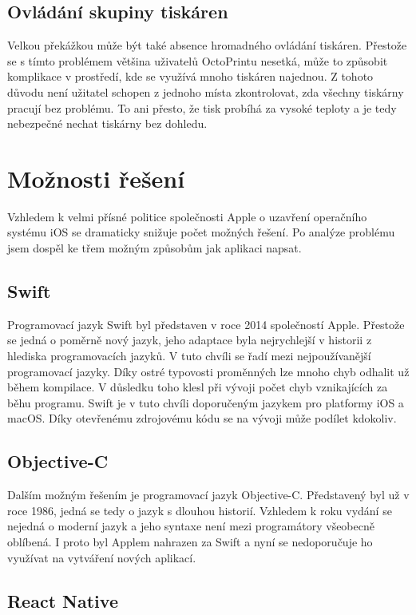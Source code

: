 \documentclass[czech]{article}
\begin{document}
\subsection{Ovládání skupiny tiskáren}

Velkou překážkou může být také absence hromadného ovládání tiskáren. Přestože se s tímto problémem většina uživatelů OctoPrintu nesetká, může to způsobit komplikace v prostředí, kde se využívá mnoho tiskáren najednou. Z tohoto důvodu není užitatel schopen z jednoho místa zkontrolovat, zda všechny tiskárny pracují bez problému. To ani přesto, že tisk probíhá za vysoké teploty a je tedy nebezpečné nechat tiskárny bez dohledu.

\section{Možnosti řešení}

Vzhledem k velmi přísné politice společnosti Apple o uzavření operačního systému iOS se dramaticky snižuje počet možných řešení. Po analýze problému jsem dospěl ke třem možným způsobům jak aplikaci napsat.

\subsection{Swift}

Programovací jazyk Swift byl představen v roce 2014 společností Apple. Přestože se jedná o poměrně nový jazyk, jeho adaptace byla nejrychlejší v historii z hlediska programovacích jazyků. V tuto chvíli se řadí mezi nejpoužívanější programovací jazyky. Díky ostré typovosti proměnných lze mnoho chyb odhalit už během kompilace. V důsledku toho klesl při vývoji počet chyb vznikajících za běhu programu. Swift je v tuto chvíli doporučeným jazykem pro platformy iOS a macOS. Díky otevřenému zdrojovému kódu se na vývoji může podílet kdokoliv.

\subsection{Objective-C}

Dalším možným řešením je programovací jazyk Objective-C. Představený byl už v roce 1986, jedná se tedy o jazyk s dlouhou historií. Vzhledem k roku vydání se nejedná o moderní jazyk a jeho syntaxe není mezi programátory všeobecně oblíbená. I proto byl Applem nahrazen za Swift a nyní se nedoporučuje ho využívat na vytváření nových aplikací.

\subsection{React Native}
\end{document}
